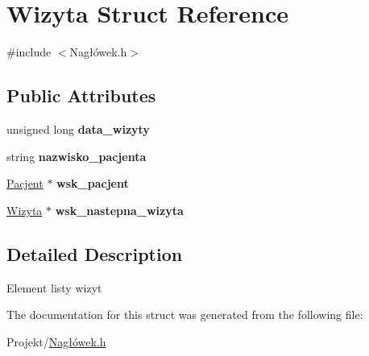 \hypertarget{struct_wizyta}{}\section{Wizyta Struct Reference}
\label{struct_wizyta}


{\ttfamily \#include $<$Nagłówek.\+h$>$}

\subsection*{Public Attributes}
\begin{DoxyCompactItemize}
\item 
\mbox{\label{struct_wizyta_a425994af189ad6687cb9972df366838d}} 
unsigned long {\bfseries data\+\_\+wizyty}
\item 
\mbox{\label{struct_wizyta_abb42e3bf8148f1e76f8d6f900039dbb2}} 
string {\bfseries nazwisko\+\_\+pacjenta}
\item 
\mbox{\label{struct_wizyta_a641be72e176f80307eca1188cd71d262}} 
\mbox{\hyperlink{struct_pacjent}{Pacjent}} $\ast$ {\bfseries wsk\+\_\+pacjent}
\item 
\mbox{\label{struct_wizyta_a32b798573fcebabc957d434d47a643c3}} 
\mbox{\hyperlink{struct_wizyta}{Wizyta}} $\ast$ {\bfseries wsk\+\_\+nastepna\+\_\+wizyta}
\end{DoxyCompactItemize}


\subsection{Detailed Description}
Element listy wizyt 

The documentation for this struct was generated from the following file\+:\begin{DoxyCompactItemize}
\item 
Projekt/\mbox{\hyperlink{_nag_xC5_x82_xC3_xB3wek_8h}{Nagłówek.\+h}}\end{DoxyCompactItemize}
